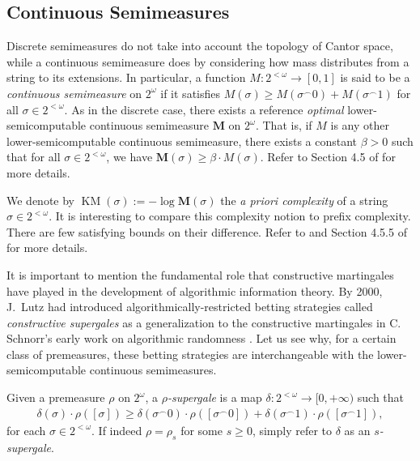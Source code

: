 \subsection{Continuous Semimeasures}
Discrete semimeasures do not take into account the topology of Cantor space, while a continuous semimeasure does by considering how mass distributes from a string to its extensions. In particular, a function $M: 2^{<\omega} \to [0, 1]$ is said to be a \textit{continuous semimeasure} on $2^\omega$ if it satisfies $M(\sigma) \geq M(\sigma^\smallfrown 0) + M(\sigma ^\smallfrown 1)$ for all $\sigma \in 2^{<\omega}$. As in the discrete case, there exists a reference \textit{optimal} lower-semicomputable continuous semimeasure $\mathbf{M}$ on $2^\omega$. That is, if $M$ is any other lower-semicomputable continuous semimeasure, there exists a constant $\beta > 0$ such that for all $\sigma \in 2^{<\omega}$, we have $\mathbf{M}(\sigma) \geq \beta \cdot M(\sigma)$. 
Refer to Section 4.5 of \cite{LV08} for more details. 

We denote by $\operatorname{KM}(\sigma) := - \log \mathbf{M}(\sigma)$ the \textit{a priori complexity} of a string $\sigma \in 2^{<\omega}$. It is interesting to compare this complexity notion to prefix complexity. There are few satisfying bounds on their difference. Refer to \cite{US96} and Section 4.5.5 of \cite{DH10} for more details.

It is important to mention the fundamental role that constructive martingales have played in the development of algorithmic information theory. By 2000, J.~Lutz had introduced algorithmically-restricted betting strategies called \textit{constructive supergales} as a generalization to the constructive martingales in C. Schnorr's early work on algorithmic randomness \cite{Lut00, Sch71}. Let us see why, for a certain class of premeasures, these betting strategies are interchangeable with the lower-semicomputable continuous semimeasures. 

Given a premeasure $\rho$ on $2^\omega$, a \textit{$\rho$-supergale} is a map $\delta : 2^{<\omega} \to [0, +\infty)$ such that
\begin{align*}
    \delta(\sigma) \cdot \rho([\sigma]) \geq \delta(\sigma^\smallfrown 0) \cdot \rho([\sigma^\smallfrown 0]) + \delta(\sigma^\smallfrown 1) \cdot \rho([\sigma^\smallfrown 1]),
\end{align*}
for each $\sigma \in 2^{<\omega}$. If indeed $\rho = \rho_{s}$ for some $s \geq 0$, simply refer to $\delta$ as an \textit{$s$-supergale}.

